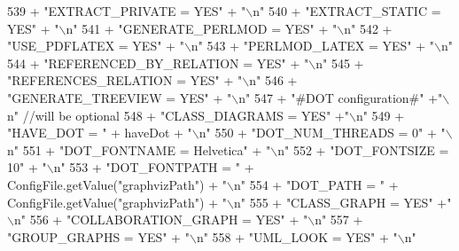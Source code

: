 \begin{DoxyCode}
539                     + \textcolor{stringliteral}{"EXTRACT\_PRIVATE = YES"} + \textcolor{stringliteral}{"\(\backslash\)n"}
540                     + \textcolor{stringliteral}{"EXTRACT\_STATIC = YES"} + \textcolor{stringliteral}{"\(\backslash\)n"}
541                     + \textcolor{stringliteral}{"GENERATE\_PERLMOD = YES"} + \textcolor{stringliteral}{"\(\backslash\)n"}
542                     + \textcolor{stringliteral}{"USE\_PDFLATEX = YES"} + \textcolor{stringliteral}{"\(\backslash\)n"}
543                     + \textcolor{stringliteral}{"PERLMOD\_LATEX = YES"} + \textcolor{stringliteral}{"\(\backslash\)n"}
544                     + \textcolor{stringliteral}{"REFERENCED\_BY\_RELATION = YES"} + \textcolor{stringliteral}{"\(\backslash\)n"}
545                     + \textcolor{stringliteral}{"REFERENCES\_RELATION = YES"} + \textcolor{stringliteral}{"\(\backslash\)n"}
546                     + \textcolor{stringliteral}{"GENERATE\_TREEVIEW = YES"} + \textcolor{stringliteral}{"\(\backslash\)n"}
547                     + \textcolor{stringliteral}{"#DOT configuration#"} +\textcolor{stringliteral}{"\(\backslash\)n"}   \textcolor{comment}{//will be optional}
548                     + \textcolor{stringliteral}{"CLASS\_DIAGRAMS = YES"} +\textcolor{stringliteral}{"\(\backslash\)n"}
549                     + \textcolor{stringliteral}{"HAVE\_DOT = "} + haveDot + \textcolor{stringliteral}{"\(\backslash\)n"}
550                     + \textcolor{stringliteral}{"DOT\_NUM\_THREADS = 0"} + \textcolor{stringliteral}{"\(\backslash\)n"}
551                     + \textcolor{stringliteral}{"DOT\_FONTNAME = Helvetica"} + \textcolor{stringliteral}{"\(\backslash\)n"}
552                     + \textcolor{stringliteral}{"DOT\_FONTSIZE = 10"} + \textcolor{stringliteral}{"\(\backslash\)n"}
553                     + \textcolor{stringliteral}{"DOT\_FONTPATH = "} + ConfigFile.getValue(\textcolor{stringliteral}{"graphvizPath"}) + \textcolor{stringliteral}{"\(\backslash\)n"}
554                     + \textcolor{stringliteral}{"DOT\_PATH = "} + ConfigFile.getValue(\textcolor{stringliteral}{"graphvizPath"}) + \textcolor{stringliteral}{"\(\backslash\)n"}
555                     + \textcolor{stringliteral}{"CLASS\_GRAPH = YES"} +\textcolor{stringliteral}{"\(\backslash\)n"}
556                     + \textcolor{stringliteral}{"COLLABORATION\_GRAPH = YES"} + \textcolor{stringliteral}{"\(\backslash\)n"}
557                     + \textcolor{stringliteral}{"GROUP\_GRAPHS = YES"} + \textcolor{stringliteral}{"\(\backslash\)n"}
558                     + \textcolor{stringliteral}{"UML\_LOOK = YES"} + \textcolor{stringliteral}{"\(\backslash\)n"}

\end{DoxyCode}
